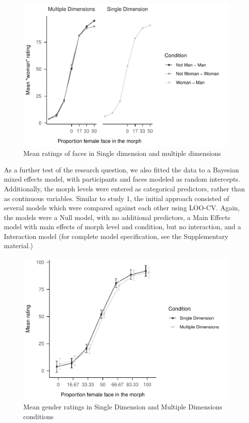 \documentclass[
  man]{apa7}
\begin{document}
\begin{figure}
\centering
\includegraphics{resp_opts_manus23022_files/figure-latex/descriptives-two-1.pdf}
\caption{\label{fig:descriptives-two}Mean ratings of faces in Single dimension and multiple dimensions}
\end{figure}

As a further test of the research question, we also fitted the data to a Bayesian mixed effects model, with participants and faces modeled as random intercepts. Additionally, the morph levels were entered as categorical predictors, rather than as continuous variables. Similar to study 1, the initial approach consisted of several models which were compared against each other using LOO-CV. Again, the models were a Null model, with no additional predictors, a Main Effects model with main effects of morph level and condition, but no interaction, and a Interaction model (for complete model specification, see the Supplementary material.)

\begin{figure}
\centering
\includegraphics{resp_opts_manus23022_files/figure-latex/exp-two-inf-1.pdf}
\caption{\label{fig:exp-two-inf}Mean gender ratings in Single Dimension and Multiple Dimensions conditions}
\end{figure}
\end{document}
